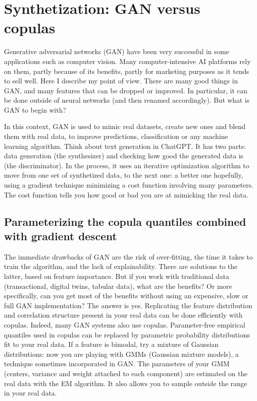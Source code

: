 \documentclass[oneside,10pt]{book}
\begin{document}
\section{Synthetization: GAN versus copulas}

\textcolor{index}{Generative adversarial networks} (GAN) have been very successful in some applications such as computer vision. Many computer-intensive AI platforms rely on them, partly because of its benefits, partly for marketing purposes as it tends to sell well. Here I describe my point of view.
There are many good things in GAN, and many features that can be dropped or improved. In particular, it can be done outside of neural networks (and then renamed accordingly). But what is GAN to begin with?


In this context, GAN is used to mimic real datasets, create new ones and blend them with real data, to improve predictions, classification or any machine learning algorithm. Think about text generation in ChatGPT. It has two parts: data generation (the synthesizer) and checking how good the generated data is (the discriminator). In the process, it uses an iterative optimization algorithm to move from one set of synthetized data, to the next one: a better one hopefully, using a gradient technique minimizing a cost function involving many parameters. The cost function tells you how good or bad you are at mimicking the real data.

\subsection{Parameterizing the copula quantiles combined with gradient descent}

The immediate drawbacks of GAN are the risk of over-fitting, the time it takes to train the algorithm, and the lack of explainability. There are solutions to the latter, based on feature importance. But if you work with traditional data (transactional, digital twins, tabular data), what are the benefits? Or more specifically, can you get most of the benefits without using an expensive, slow or full GAN implementation?
The answer is yes. Replicating the feature distribution and correlation structure present in your real data can be done efficiently with copulas.  Indeed, many GAN systems also use copulas. Parameter-free empirical quantiles used in copulas  can be replaced by parametric probability distributions fit to your real data. If a feature is bimodal, try a mixture of Gaussian distributions:
now you are playing with GMMs (\textcolor{index}{Gaussian mixture models}), a technique sometimes incorporated in GAN. The parameters of your GMM (centers, variance and weight attached to each component) are estimated on the real data with the \textcolor{index}{EM algorithm}. It also allows you to sample outside the range in your real data.
\end{document}
